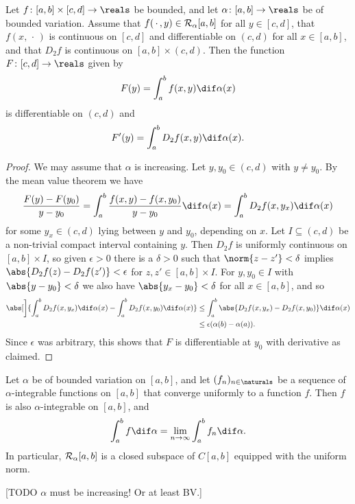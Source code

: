 \documentclass[article, a4paper, 11pt, oneside]{memoir}
\numberwithin{equation}{chapter}
\begin{document}
\begin{proposition}
    Let $f \colon [a,b] \times [c,d] \to \reals$ be bounded, and let $\alpha \colon [a,b] \to \reals$ be of bounded variation. Assume that $f(\,\cdot\,,y) \in \integrable[\alpha]{a,b}$ for all $y \in [c,d]$, that $f(x,\,\cdot\,)$ is continuous on $[c,d]$ and differentiable on $(c,d)$ for all $x \in [a,b]$, and that $D_2 f$ is continuous on $[a,b] \times (c,d)$. Then the function $F \colon [c,d] \to \reals$ given by
    \begin{equation*}
        F(y)
            = \int_a^b f(x,y) \dif\alpha(x)
    \end{equation*}
    is differentiable on $(c,d)$ and
    \begin{equation*}
        F'(y)
            = \int_a^b D_2 f(x,y) \dif\alpha(x).
    \end{equation*}
\end{proposition}

\begin{proof}
    We may assume that $\alpha$ is increasing. Let $y,y_0 \in (c,d)$ with $y \neq y_0$. By the mean value theorem we have
    \begin{equation*}
        \frac{F(y) - F(y_0)}{y - y_0}
            = \int_a^b \frac{f(x,y) - f(x,y_0)}{y - y_0} \dif\alpha(x)
            = \int_a^b D_2 f(x, y_x) \dif\alpha(x)
    \end{equation*}
    for some $y_x \in (c,d)$ lying between $y$ and $y_0$, depending on $x$. Let $I \subseteq (c,d)$ be a non-trivial compact interval containing $y$. Then $D_2 f$ is uniformly continuous on $[a,b] \times I$, so given $\epsilon > 0$ there is a $\delta > 0$ such that $\norm{z-z'} < \delta$ implies $\abs{D_2 f(z) - D_2 f(z')} < \epsilon$ for $z,z' \in [a,b] \times I$. For $y,y_0 \in I$ with $\abs{y-y_0} < \delta$ we also have $\abs{y_x-y_0} < \delta$ for all $x \in [a,b]$, and so
    \begin{align*}
        \abs[\bigg]{ \int_a^b D_2 f(x, y_x) \dif\alpha(x)
            - \int_a^b D_2 f(x, y_0) \dif\alpha(x) }
            &\leq \int_a^b \abs{ D_2 f(x, y_x) - D_2 f(x, y_0) } \dif\alpha(x) \\
            &\leq \epsilon (\alpha(b) - \alpha(a)).
    \end{align*}
    Since $\epsilon$ was arbitrary, this shows that $F$ is differentiable at $y_0$ with derivative as claimed.
\end{proof}


\begin{proposition}
    Let $\alpha$ be of bounded variation on $[a,b]$, and let $(f_n)_{n\in\naturals}$ be a sequence of $\alpha$-integrable functions on $[a,b]$ that converge uniformly to a function $f$. Then $f$ is also $\alpha$-integrable on $[a,b]$, and
    \begin{equation*}
        \int_a^b f \dif\alpha
            = \lim_{n\to\infty} \int_a^b f_n \dif\alpha.
    \end{equation*}
    In particular, $\integrable[\alpha]{a,b}$ is a closed subspace of $C[a,b]$ equipped with the uniform norm.

    [TODO $\alpha$ must be increasing! Or at least BV.]
\end{proposition}
\end{document}

